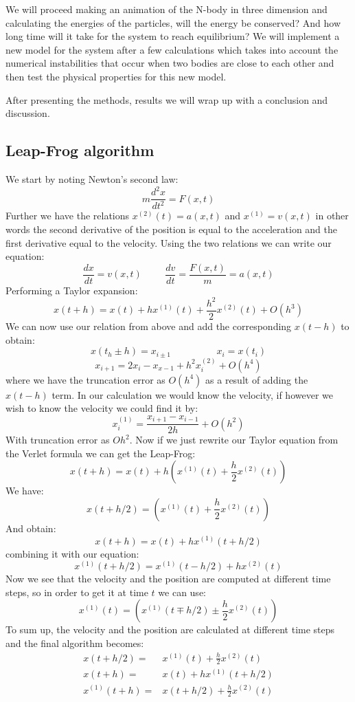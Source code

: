 \documentclass{article}
\begin{document}
We will proceed making an animation of the N-body in three dimension and calculating the energies of the particles, will the energy be conserved? And how long time will it take for the system to reach equilibrium? We will implement a new model for the system after a few calculations which takes into account the numerical instabilities that occur when two bodies are close to each other and then test the physical properties for this new model. 

After presenting the methods, results we will wrap up with a conclusion and discussion. 

\subsection{Leap-Frog algorithm}
We start by noting Newton's second law:
$$m\frac{d^2x}{dt^2} = F(x,t)$$ 
Further we have the relations $x^{(2)}(t) = a(x, t)$ and $x^{(1)} = v(x,t)$ in other words the second derivative of the position is equal to the acceleration and the first derivative equal to the velocity.
Using the two relations we can write our equation:
$$\frac{dx}{dt} = v(x,t) \hspace{1cm} \frac{dv}{dt} = \frac{F(x,t)}{m} = a(x,t)$$ 
Performing a Taylor expansion:
$$x(t+h) = x(t) + hx^{(1)}(t) + \frac{h^2}{2}x^{(2)}(t) + O(h^3)$$
We can now use our relation from above and add the corresponding $x(t-h)$ to obtain:
$$x(t_h \pm h) = x_{i\pm1} \hspace{2cm} x_i = x(t_i)$$
$$x_{i+1} = 2x_i - x_{x-1} + h^2x_i^{(2)} + O(h^4)$$
where we have the truncation error as $O(h^4)$ as a result of adding the $x(t - h)$ term. 
In our calculation we would know the velocity, if however we wish  to know the velocity we could find it by:
$$x_i^{(1)} = \frac{x_{i+1} - x_{i-1}}{2h} + O(h^2)$$
With truncation error as $Oh^2$. 
Now if we just rewrite our Taylor equation from the Verlet formula we can get the Leap-Frog:
$$x(t+h) = x(t) + h\left(x^{(1)}(t) + \frac{h}{2}x^{(2)}(t)\right)$$
We have:
$$x(t+h/2) =\left(x^{(1)}(t) + \frac{h}{2}x^{(2)}(t)\right)$$
And obtain:
$$x(t+h) = x(t) + hx^{(1)}(t + h/2)$$
combining it with our equation:
$$x^{(1)}(t + h/2) = x^{(1)}(t - h/2) + hx^{(2)}(t)$$
Now we see that the velocity and the position are computed at different time steps, so in order to get it at time $t$ we can use:
$$x^{(1)}(t) = \left(x^{(1)}(t \mp h/2) \pm \frac{h}{2}x^{(2)}(t)\right)$$
To sum up, the velocity and the position are calculated at different time steps and the final algorithm becomes:
\begin{align*}
x(t+h/2) =& x^{(1)}(t) + \frac{h}{2}x^{(2)}(t)\\
x(t+h) =& x(t) + hx^{(1)}(t + h/2)\\
x^{(1)}(t+h) =& x(t+h/2)+ \frac{h}{2}x^{(2)}(t)
\end{align*}
\end{document}
